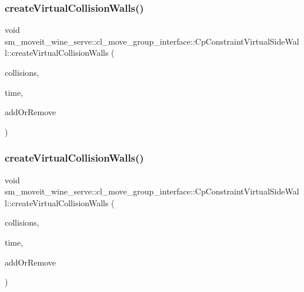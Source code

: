 \subsubsection{\texorpdfstring{create\+Virtual\+Collision\+Walls()}{createVirtualCollisionWalls()}\hspace{0.1cm}{\footnotesize\ttfamily [1/2]}}
{\footnotesize\ttfamily void sm\+\_\+moveit\+\_\+wine\+\_\+serve\+::cl\+\_\+move\+\_\+group\+\_\+interface\+::\+Cp\+Constraint\+Virtual\+Side\+Wall\+::create\+Virtual\+Collision\+Walls (\begin{DoxyParamCaption}\item[{std\+::vector$<$ moveit\+\_\+msgs\+::\+Collision\+Object $>$ \&}]{collisions,  }\item[{const ros\+::\+Time \&}]{time,  }\item[{int}]{add\+Or\+Remove }\end{DoxyParamCaption})}

\mbox{\label{classsm__moveit__wine__serve_1_1cl__move__group__interface_1_1CpConstraintVirtualSideWall_a98576104cf4c349341031848477b2d5b}} 
\subsubsection{\texorpdfstring{create\+Virtual\+Collision\+Walls()}{createVirtualCollisionWalls()}\hspace{0.1cm}{\footnotesize\ttfamily [2/2]}}
{\footnotesize\ttfamily void sm\+\_\+moveit\+\_\+wine\+\_\+serve\+::cl\+\_\+move\+\_\+group\+\_\+interface\+::\+Cp\+Constraint\+Virtual\+Side\+Wall\+::create\+Virtual\+Collision\+Walls (\begin{DoxyParamCaption}\item[{std\+::vector$<$ moveit\+\_\+msgs\+::\+Collision\+Object $>$ \&}]{collisions,  }\item[{const ros\+::\+Time \&}]{time,  }\item[{int}]{add\+Or\+Remove }\end{DoxyParamCaption})}



